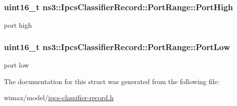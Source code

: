 \subsubsection[{\texorpdfstring{Port\+High}{PortHigh}}]{\setlength{\rightskip}{0pt plus 5cm}uint16\+\_\+t ns3\+::\+Ipcs\+Classifier\+Record\+::\+Port\+Range\+::\+Port\+High}\hypertarget{structns3_1_1IpcsClassifierRecord_1_1PortRange_ae9059d318445aaaa1476ac86f8795381}{}\label{structns3_1_1IpcsClassifierRecord_1_1PortRange_ae9059d318445aaaa1476ac86f8795381}


port high 

\subsubsection[{\texorpdfstring{Port\+Low}{PortLow}}]{\setlength{\rightskip}{0pt plus 5cm}uint16\+\_\+t ns3\+::\+Ipcs\+Classifier\+Record\+::\+Port\+Range\+::\+Port\+Low}\hypertarget{structns3_1_1IpcsClassifierRecord_1_1PortRange_ac8b4597f55837bf2c713adb4944d2ce2}{}\label{structns3_1_1IpcsClassifierRecord_1_1PortRange_ac8b4597f55837bf2c713adb4944d2ce2}


port low 



The documentation for this struct was generated from the following file\+:\begin{DoxyCompactItemize}
\item 
wimax/model/\hyperlink{ipcs-classifier-record_8h}{ipcs-\/classifier-\/record.\+h}\end{DoxyCompactItemize}
